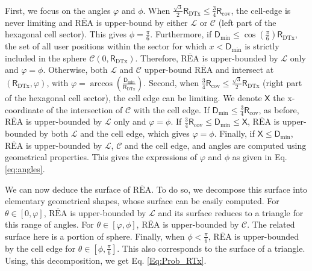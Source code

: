 \documentclass[journal]{IEEEtran}
\theoremstyle{definition}
\begin{document}
First, we focus on the angles $\varphi$ and $\phi$.
When $\frac{\sqrt{3}}{2}\mathsf{R}_{\text{DTx}} \leq  \frac{3}{4}\mathsf{R}_{\text{cov}}$, the cell-edge is never limiting and $\overline{\text{REA}}$ is upper-bound by either $\mathcal{L}$ or $\mathcal{C}$ (left part of the hexagonal cell sector). This gives $\phi = \frac{\pi}{6}$.
Furthermore, if $\mathsf{D}_{\min} \leq \cos \left( \frac{\pi}{6}\right)\mathsf{R}_{\text{DTx}}$, the set of all user positions within the sector for which $x < \mathsf{D}_{\min}$ is strictly included in the sphere $\mathcal{C}\left(0, \mathsf{R}_{\text{DTx}}\right)$. Therefore, $\overline{\text{REA}}$ is upper-bounded by $\mathcal{L}$ only and $\varphi = \phi$. 
Otherwise, both $\mathcal{L}$ and $\mathcal{C}$ upper-bound $\overline{\text{REA}}$ and intersect at $\left(\mathsf{R}_{\text{DTx}},\varphi \right)$, with $\varphi = \arccos \left(\frac{\mathsf{D}_{\min}}{\mathsf{R}_{\text{DTx}}}\right)$.
Second, when $\frac{3}{4}\mathsf{R}_{\text{cov}} \leq \frac{\sqrt{3}}{2}\mathsf{R}_{\text{DTx}}$ (right part of the hexagonal cell sector), the cell edge can be limiting. We denote $\mathsf{X}$ the x-coordinate of the intersection of $\mathcal{C}$ with the cell edge.
If $\mathsf{D}_{\min} \leq \frac{3}{4}\mathsf{R}_{\text{cov}}$, as before, $\overline{\text{REA}}$ is upper-bounded by $\mathcal{L}$ only and $\varphi = \phi$.
If $\frac{3}{4}\mathsf{R}_{\text{cov}} \leq \mathsf{D}_{\min} \leq \mathsf{X}$, $\overline{\text{REA}}$ is upper-bounded by both $\mathcal{L}$ and the cell edge, which gives $\varphi = \phi$.
Finally, if $\mathsf{X} \leq \mathsf{D}_{\min} $, $\overline{\text{REA}}$ is upper-bounded by $\mathcal{L}$, $\mathcal{C}$ and the cell edge, and angles are computed using geometrical properties.
This gives the expressions of $\varphi$ and $\phi$ as given in Eq. \eqref{eq:angles}.

We can now deduce the surface of $\overline{\text{REA}}$. To do so, we decompose this surface into elementary geometrical shapes, whose surface can be easily computed.
For $\theta \in \left[0, \varphi\right]$, $\overline{\text{REA}}$ is upper-bounded by $\mathcal{L}$ and its surface reduces to a triangle for this range of angles.
For $\theta \in \left[\varphi, \phi \right]$, $\overline{\text{REA}}$ is upper-bounded by $\mathcal{C}$. The related surface here is a portion of sphere. Finally, 
when $\phi < \frac{\pi}{6}$, $\overline{\text{REA}}$ is upper-bounded by the cell edge for $\theta \in \left[\phi, \frac{\pi}{6} \right]$. This also corresponds to the surface of a triangle.
Using, this decomposition, we get Eq. \eqref{Eq:Prob_RTx}.
\end{document}
